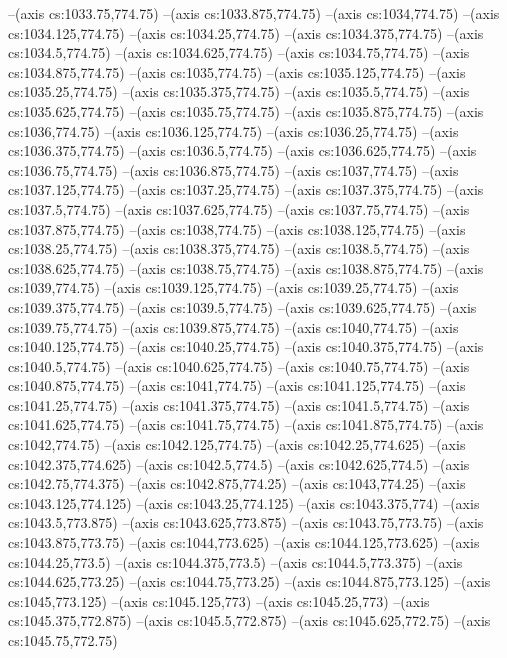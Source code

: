 --(axis cs:1033.75,774.75)
--(axis cs:1033.875,774.75)
--(axis cs:1034,774.75)
--(axis cs:1034.125,774.75)
--(axis cs:1034.25,774.75)
--(axis cs:1034.375,774.75)
--(axis cs:1034.5,774.75)
--(axis cs:1034.625,774.75)
--(axis cs:1034.75,774.75)
--(axis cs:1034.875,774.75)
--(axis cs:1035,774.75)
--(axis cs:1035.125,774.75)
--(axis cs:1035.25,774.75)
--(axis cs:1035.375,774.75)
--(axis cs:1035.5,774.75)
--(axis cs:1035.625,774.75)
--(axis cs:1035.75,774.75)
--(axis cs:1035.875,774.75)
--(axis cs:1036,774.75)
--(axis cs:1036.125,774.75)
--(axis cs:1036.25,774.75)
--(axis cs:1036.375,774.75)
--(axis cs:1036.5,774.75)
--(axis cs:1036.625,774.75)
--(axis cs:1036.75,774.75)
--(axis cs:1036.875,774.75)
--(axis cs:1037,774.75)
--(axis cs:1037.125,774.75)
--(axis cs:1037.25,774.75)
--(axis cs:1037.375,774.75)
--(axis cs:1037.5,774.75)
--(axis cs:1037.625,774.75)
--(axis cs:1037.75,774.75)
--(axis cs:1037.875,774.75)
--(axis cs:1038,774.75)
--(axis cs:1038.125,774.75)
--(axis cs:1038.25,774.75)
--(axis cs:1038.375,774.75)
--(axis cs:1038.5,774.75)
--(axis cs:1038.625,774.75)
--(axis cs:1038.75,774.75)
--(axis cs:1038.875,774.75)
--(axis cs:1039,774.75)
--(axis cs:1039.125,774.75)
--(axis cs:1039.25,774.75)
--(axis cs:1039.375,774.75)
--(axis cs:1039.5,774.75)
--(axis cs:1039.625,774.75)
--(axis cs:1039.75,774.75)
--(axis cs:1039.875,774.75)
--(axis cs:1040,774.75)
--(axis cs:1040.125,774.75)
--(axis cs:1040.25,774.75)
--(axis cs:1040.375,774.75)
--(axis cs:1040.5,774.75)
--(axis cs:1040.625,774.75)
--(axis cs:1040.75,774.75)
--(axis cs:1040.875,774.75)
--(axis cs:1041,774.75)
--(axis cs:1041.125,774.75)
--(axis cs:1041.25,774.75)
--(axis cs:1041.375,774.75)
--(axis cs:1041.5,774.75)
--(axis cs:1041.625,774.75)
--(axis cs:1041.75,774.75)
--(axis cs:1041.875,774.75)
--(axis cs:1042,774.75)
--(axis cs:1042.125,774.75)
--(axis cs:1042.25,774.625)
--(axis cs:1042.375,774.625)
--(axis cs:1042.5,774.5)
--(axis cs:1042.625,774.5)
--(axis cs:1042.75,774.375)
--(axis cs:1042.875,774.25)
--(axis cs:1043,774.25)
--(axis cs:1043.125,774.125)
--(axis cs:1043.25,774.125)
--(axis cs:1043.375,774)
--(axis cs:1043.5,773.875)
--(axis cs:1043.625,773.875)
--(axis cs:1043.75,773.75)
--(axis cs:1043.875,773.75)
--(axis cs:1044,773.625)
--(axis cs:1044.125,773.625)
--(axis cs:1044.25,773.5)
--(axis cs:1044.375,773.5)
--(axis cs:1044.5,773.375)
--(axis cs:1044.625,773.25)
--(axis cs:1044.75,773.25)
--(axis cs:1044.875,773.125)
--(axis cs:1045,773.125)
--(axis cs:1045.125,773)
--(axis cs:1045.25,773)
--(axis cs:1045.375,772.875)
--(axis cs:1045.5,772.875)
--(axis cs:1045.625,772.75)
--(axis cs:1045.75,772.75)
